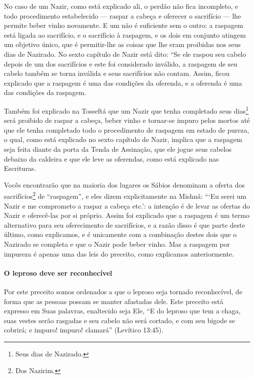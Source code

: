 No caso de um Nazir, como está explicado ali, o perdão não fica
incompleto, e todo procedimento estabelecido --- raspar a cabeça e
oferecer o sacrifício --- lhe permite beber vinho novamente. E um não é
suficiente sem o outro: a raspagem está ligada ao sacrifício, e o
sacrifício à raspagem, e os dois em conjunto atingem um objetivo único,
que é permitir-lhe as coisas que lhe eram proibidas nos seus dias de
Nazirado. No sexto capítulo de Nazir está dito: ``Se ele raspou seu
cabelo depois de um dos sacrifícios e este foi considerado inválido, a
raspagem de seu cabelo também se torna inválida e seus sacrifícios não
contam. Assim, ficou explicado que a raspagem é uma das condições da
oferenda, e a oferenda é uma das condições da raspagem.

Também foi explicado na Tosseftá que um Nazir que tenha completado seus dias\footnote{Seus dias de Nazirado.} será proibido de raspar a cabeça,
beber vinho e tornar-se impuro pelos mortos até que ele tenha completado todo o procedimento de raspagem em estado de pureza, o qual, como está explicado no sexto capítulo de Nazir, implica que a raspagem seja feita diante da porta da Tenda de
Assinação, que ele jogue seus cabelos debaixo da caldeira e que ele
leve as oferendas, como está explicado nas Escrituras.

Vocês encontrarão que na maioria dos lugares os Sábios denominam
a oferta dos sacrifícios\footnote{Dos Nazirim.} de ``raspagem'', e eles
dizem explicitamente na Mishná: ```Eu serei um Nazir e me comprometo a
raspar a cabeça etc.': a intenção é de levar as ofertas do Nazir e
oferecê-las por si próprio. Assim foi explicado que a raspagem é um
termo alternativo para seu oferecimento de sacrifícios, e a razão disso
é que parte deste último, como explicamos, e é unicamente com a
combinação destes dois que o Nazirado se completa e que o Nazir pode
beber vinho. Mas a raspagem por impureza é apenas uma das leis do
preceito, como explicamos anteriormente.

\paragraph{O leproso deve ser reconhecível}

Por este preceito somos ordenados a que o leproso seja tornado
reconhecível, de forma que as pessoas possam se manter afastadas dele.
Este preceito está expresso em Suas palavras, enaltecido seja Ele, ``E
do leproso que tem a chaga, suas vestes serão rasgadas e seu cabelo não
será cortado, e com seu bigode se cobrirá; e impuro! impuro! clamará''
(Levítico 13:45).

